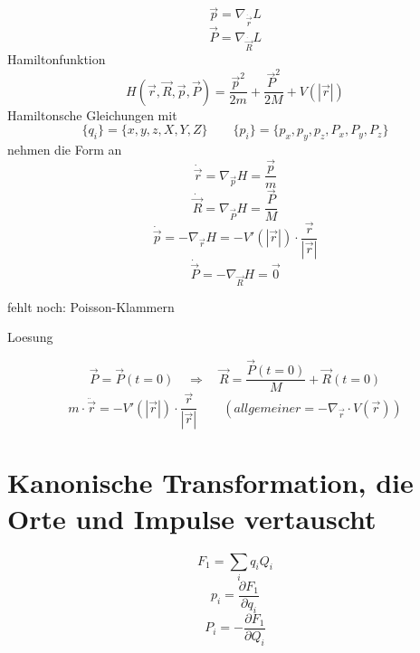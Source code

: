 \documentclass[11pt]{article} %
\begin{document}
\begin{equation} \vec{p} = \nabla _{\dot{\vec{r}}} L \end{equation}
\begin{equation} \vec{P} = \nabla _{\dot{\vec{R}}} L \end{equation}
Hamiltonfunktion
\begin{equation}
H(\vec{r},\vec{R},\vec{p},\vec{P}) = 
\frac{\vec{p}^2}{2m} +  \frac{\vec{P}^2}{2M}
+ V(\left| \vec{r} \right|)
\end{equation}
Hamiltonsche Gleichungen
mit
\begin{equation} \{q_i\} = \{ x, y, z, X, Y, Z \} \quad \quad \{p_i\} = \{ p_{x}, p_{y}, p_{z}, P_{x}, P_{y}, P_{z} \} \end{equation}
nehmen die Form an
\begin{equation} \dot{\vec{r}} = \nabla_{\vec{p}} H = \frac{ \vec{p} }{m} \end{equation}
\begin{equation} \dot{\vec{R}} = \nabla_{\vec{P}} H = \frac{ \vec{P} }{M} \end{equation}
\begin{equation} \dot{\vec{p}} = - \nabla_{\vec{r}} H = -V'( \left| \vec{r} \right| ) \cdot \frac{ \vec{r} }{ \left| \vec{r} \right| } \end{equation}
\begin{equation} \dot{\vec{P}} = - \nabla_{\vec{R}} H = \vec{0} \end{equation}

fehlt noch: Poisson-Klammern

Loesung

\begin{equation} 
\vec{P} = \vec{P}(t = 0) \quad \Rightarrow \quad \vec{R} = \frac{ \vec{P}(t = 0) }{M} +  \vec{R}(t = 0)
\end{equation}
\begin{equation} m\cdot \ddot \vec{r} = -V'( \left| \vec{r} \right| ) \cdot \frac{\vec{r}}{\left| \vec{r} \right|}
\quad \quad ( allgemeiner = -\nabla_{\vec{r}} \cdot V(\vec{r}) ) \end{equation}

\section{Kanonische Transformation, die Orte und Impulse vertauscht}

\begin{equation} F_1 = \sum_iq_iQ_i \end{equation}
\begin{equation}p_i = \frac{\partial F_1}{\partial q_i} \end{equation}
\begin{equation}P_i = - \frac{\partial F_1}{\partial Q_i} \end{equation}
\end{document}
